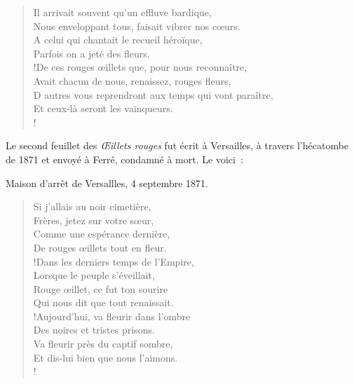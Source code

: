 \documentclass[french,twoside]{book} %
\newcommand{\salute}[1]{\bigbreak{#1}\par\medbreak}
\newenvironment{quoteblock}%
  {\begin{quoting}}
  {\end{quoting}}
\newenvironment{quotebar}{%
    \def\FrameCommand{{\color{rubric!10!}\vrule width 0.5em} \hspace{0.9em}}%
    \def\OuterFrameSep{\itemsep} %
    \MakeFramed {\advance\hsize-\width \FrameRestore}
  }%
  {%
    \endMakeFramed
  }
\renewenvironment{quoteblock}%
  {%
    \savenotes
    \setstretch{0.9}
    \normalfont
    \begin{quotebar}
  }
  {%
    \end{quotebar}
    \spewnotes
  }
\begin{document}
\begin{verse}
Il arrivait souvent qu’un effluve bardique,\\
Nous enveloppant tous, faisait vibrer nos cœurs.\\
A celui qui chantait le recueil héroïque,\\
\hspace{1em}\hspace{1em}Parfois on a jeté des fleurs.\\!De ces rouges œillets que, pour nous reconnaître,\\
Avait chacun de nous, renaissez, rouges fleurs,\\
D autres vous reprendront aux temps qui vont paraître,\\
\hspace{1em}\hspace{1em}Et ceux-là seront les vainqueurs.\\!
\end{verse}

\noindent Le second feuillet des \emph{Œillets rouges} fut écrit à Versailles, à travers l’hécatombe de 1871 et envoyé à Ferré, condamné à mort. Le voici :\par

\begin{quoteblock}
Maison d’arrêt de Versallles, 4 septembre 1871.
\salute{A Th. Ferré}
\end{quoteblock}

\begin{verse}
Si j’allais au noir cimetière,\\
Frères, jetez sur votre sœur,\\
Comme une espérance dernière,\\
De rouges œillets tout en fleur.\\!Dans les derniers temps de l’Empire,\\
Lorsque le peuple s’éveillait,\\
Rouge œillet, ce fut ton sourire \\
Qui nous dit que tout renaissait.\\!Aujourd’hui, va fleurir dans l’ombre\\
Des noires et tristes prisons.\\
Va fleurir près du captif sombre,\\
Et dis-lui bien que nous l’aimons.\\!
\end{verse}
\begin{quoteblock}
 \end{quoteblock}
\end{document}
